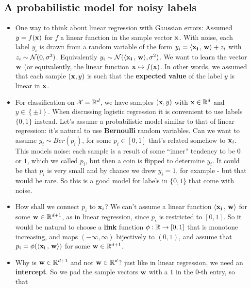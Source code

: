\subsection{A probabilistic model for noisy labels}
\begin{itemize}
  \item One way to think about linear regression with Gaussian errors: 
    Assumed $y=f(\mathbf{x})$ for $f$ a linear function in the sample vector $\mathbf{x}$.
    With noise, each label $y_i$ is drawn from a random variable of the form
    $y_i = {\left\langle \mathbf{x_i}\,,\,\mathbf{w} \right\rangle}  + z_i$ with $z_i \sim \mathcal{N}(0,\sigma^2)$.
    Equivalently
    $y_i \sim \mathcal{N}( {\left\langle \mathbf{x_i}\,,\,\mathbf{w} \right\rangle} , \sigma^2)$. 
    We want to learn the vector $\mathbf{w}$ (or equivalently, the linear function
      $\mathbf{x}\mapsto f(\mathbf{x})$. 
      In other words, we assumed that each sample $(\mathbf{x},y)$ is such that
      the {\bf expected value} of the label $y$ is
      linear in $\mathbf{x}$. 
    \item For classification on $\mathcal{X}=\mathbb{R}^d$, we have samples $(\mathbf{x},y)$ with
      $\mathbf{x}\in\mathbb{R}^d$ and $y\in\left\{ \pm 1 \right\}$. When discussing
      logistic regression it is convenient to use labels $\{0,1\}$ instead. 
      Let's assume a probabilistic model similar to that of linear regression:
      it's natural to use {\bf Bernoulli} random variables. Can we want to assume 
      $y_i \sim Ber(p_i)$, for some $p_i\in[0,1]$ that's related somehow to
      $\mathbf{x}_i$. This models noise: each sample is a result of some ``inner''
      tendency to be $0$ or $1$, which we called $p_i$, but then a coin is
      flipped to determine $y_i$. It could be that $p_i$ is very small and by
      chance we drew $y_i=1$, for example - but that would be rare. So this is a
      good model for labels in $\{0,1\}$ that come with noise.  
    \item How shall we connect $p_i$ to $\mathbf{x}_i$? We can't assume a linear
      function ${\left\langle \mathbf{x_i}\,,\,\mathbf{w} \right\rangle}$ for some $\mathbf{w}\in \mathbb{R}^{d+1}$, as in linear regression, since $p_i$ is
      restricted to $[0,1]$. So it would be natural to choose a {\bf link}
      function $\phi:\mathbb{R}\to[0,1]$ that is monotone increasing, and maps
      $(-\infty,\infty)$ bijectively to $(0,1)$,  and assume
      that $p_i = \phi ({\left\langle \mathbf{x_i}\,,\,\mathbf{w} \right\rangle} ) $ for some
      $\mathbf{w}\in\mathbb{R}^{d+1}$.  
    \item 	Why is $\mathbf{w}\in\mathbb{R}^{d+1}$ and not  $\mathbf{w}\in\mathbb{R}^{d}$?
	just like in linear regression, we need an {\bf intercept}. So we pad
	the sample vectors $\mathbf{w}$ with a $1$ in the $0$-th entry, so that 

\end{itemize}
